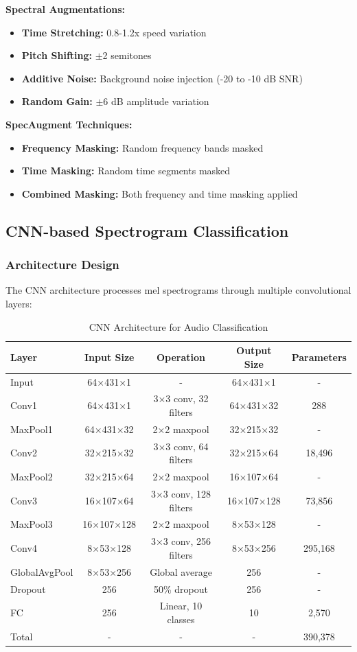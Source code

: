 \documentclass[conference]{IEEEtran}
\begin{document}
\textbf{Spectral Augmentations:}
\begin{itemize}
  \item \textbf{Time Stretching:} 0.8-1.2x speed variation
  \item \textbf{Pitch Shifting:} $\pm$2 semitones
  \item \textbf{Additive Noise:} Background noise injection (-20 to -10 dB SNR)
  \item \textbf{Random Gain:} $\pm$6 dB amplitude variation
\end{itemize}

\textbf{SpecAugment Techniques:}
\begin{itemize}
  \item \textbf{Frequency Masking:} Random frequency bands masked
  \item \textbf{Time Masking:} Random time segments masked
  \item \textbf{Combined Masking:} Both frequency and time masking applied
\end{itemize}

\subsection{CNN-based Spectrogram Classification}
\label{sec:q2_cnn}

\subsubsection{Architecture Design}
\label{sec:q2_cnn_architecture}

The CNN architecture processes mel spectrograms through multiple convolutional layers:

\begin{table}[H]
\centering
\caption{CNN Architecture for Audio Classification}
\begin{tabular}{l c c c c}
\toprule
Layer & Input Size & Operation & Output Size & Parameters \\
\midrule
Input & 64×431×1 & - & 64×431×1 & - \\
Conv1 & 64×431×1 & 3×3 conv, 32 filters & 64×431×32 & 288 \\
MaxPool1 & 64×431×32 & 2×2 maxpool & 32×215×32 & - \\
Conv2 & 32×215×32 & 3×3 conv, 64 filters & 32×215×64 & 18,496 \\
MaxPool2 & 32×215×64 & 2×2 maxpool & 16×107×64 & - \\
Conv3 & 16×107×64 & 3×3 conv, 128 filters & 16×107×128 & 73,856 \\
MaxPool3 & 16×107×128 & 2×2 maxpool & 8×53×128 & - \\
Conv4 & 8×53×128 & 3×3 conv, 256 filters & 8×53×256 & 295,168 \\
GlobalAvgPool & 8×53×256 & Global average & 256 & - \\
Dropout & 256 & 50\% dropout & 256 & - \\
FC & 256 & Linear, 10 classes & 10 & 2,570 \\
\midrule
Total & - & - & - & 390,378 \\
\toprule
\end{tabular}
\label{tab:cnn_architecture}
\end{table}
\end{document}
